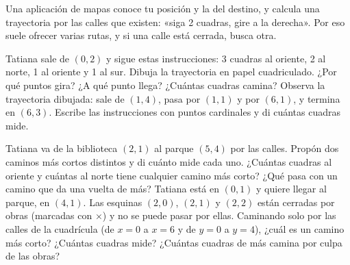 \documentclass[11pt]{article}
\newcommand{\ejes}[2]{%
  \draw[gray!45] (0,0) grid (#1,#2);
  \draw[->, thick] (0,0) -- (#1+0.5,0) node[right, font=\small] {$x$};
  \draw[->, thick] (0,0) -- (0,#2+0.5) node[above, font=\small] {$y$};
  \foreach \i in {1,...,#1}
    \node[below, font=\scriptsize, text height=1.5ex, text depth=0.25ex] at (\i,0) {\i};
  \foreach \j in {1,...,#2} \node[left, font=\scriptsize] at (0,\j) {\j};
  \node[below left, font=\scriptsize] at (0,0) {0};}
\begin{document}
\begin{aplicacion}
Una aplicación de mapas conoce tu posición y la del destino, y calcula una trayectoria por las
calles que existen: «siga 2 cuadras, gire a la derecha». Por eso suele ofrecer varias rutas, y
si una calle está cerrada, busca otra.
\end{aplicacion}

\begin{preguntas}
\pregunta Tatiana sale de $(0, 2)$ y sigue estas instrucciones: 3 cuadras al oriente, 2 al
norte, 1 al oriente y 1 al sur. Dibuja la trayectoria en papel cuadriculado. ¿Por qué puntos
gira? ¿A qué punto llega? ¿Cuántas cuadras camina?
\espacio{3.5cm}
\pregunta Observa la trayectoria dibujada: sale de $(1, 4)$, pasa por $(1, 1)$ y por $(6, 1)$,
y termina en $(6, 3)$. Escribe las instrucciones con puntos cardinales y di cuántas cuadras
mide.

\begin{center}
\end{center}
\pregunta Tatiana va de la biblioteca $(2, 1)$ al parque $(5, 4)$ por las calles. Propón dos
caminos más cortos distintos y di cuánto mide cada uno. ¿Cuántas cuadras al oriente y cuántas
al norte tiene cualquier camino más corto? ¿Qué pasa con un camino que da una vuelta de más?
\pregunta Tatiana está en $(0, 1)$ y quiere llegar al parque, en $(4, 1)$. Las esquinas
$(2, 0)$, $(2, 1)$ y $(2, 2)$ están cerradas por obras (marcadas con $\times$) y no se puede
pasar por ellas. Caminando solo por las calles de la cuadrícula (de $x = 0$ a $x = 6$ y de
$y = 0$ a $y = 4$), ¿cuál es un camino más corto? ¿Cuántas cuadras mide? ¿Cuántas cuadras de
más camina por culpa de las obras?

\begin{center}
\end{center}
\end{preguntas}
\end{document}
